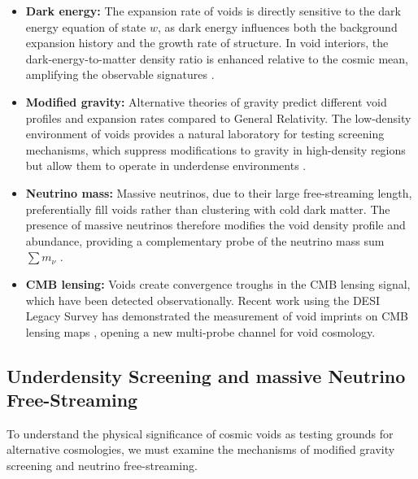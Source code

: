 \documentclass[12pt]{report}
\begin{document}
\begin{itemize}
    \item \textbf{Dark energy:} The expansion rate of voids is directly sensitive to the dark energy equation of state $w$, as dark energy influences both the background expansion history and the growth rate of structure. In void interiors, the dark-energy-to-matter density ratio is enhanced relative to the cosmic mean, amplifying the observable signatures \citep{Pisani2015,Pisani2019MNRAS}.

    \item \textbf{Modified gravity:} Alternative theories of gravity predict different void profiles and expansion rates compared to General Relativity. The low-density environment of voids provides a natural laboratory for testing screening mechanisms, which suppress modifications to gravity in high-density regions but allow them to operate in underdense environments \citep{Li2012,Contarini2021}.

    \item \textbf{Neutrino mass:} Massive neutrinos, due to their large free-streaming length, preferentially fill voids rather than clustering with cold dark matter. The presence of massive neutrinos therefore modifies the void density profile and abundance, providing a complementary probe of the neutrino mass sum $\sum m_\nu$ \citep{Massara2015,Contarini2021}.

    \item \textbf{CMB lensing:} Voids create convergence troughs in the CMB lensing signal, which have been detected observationally. Recent work using the DESI Legacy Survey has demonstrated the measurement of void imprints on CMB lensing maps \citep{Aubert2024}, opening a new multi-probe channel for void cosmology.
\end{itemize}

\subsection{Underdensity Screening and massive Neutrino Free-Streaming}
\label{sec:screening_neutrinos}

To understand the physical significance of cosmic voids as testing grounds for alternative cosmologies, we must examine the mechanisms of modified gravity screening and neutrino free-streaming. 
\end{document}
